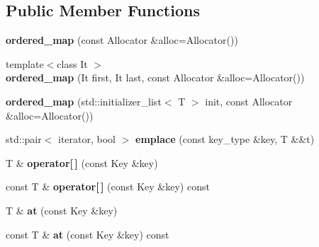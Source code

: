 \subsection*{Public Member Functions}
\begin{DoxyCompactItemize}
\item 
\mbox{\label{structnlohmann_1_1ordered__map_a87938c10b76510dac00412d2cb5fd1e4}} 
{\bfseries ordered\+\_\+map} (const Allocator \&alloc=Allocator())
\item 
\mbox{\label{structnlohmann_1_1ordered__map_a9d25efb51325cc1be027b8ea00c1f8b8}} 
{\footnotesize template$<$class It $>$ }\\{\bfseries ordered\+\_\+map} (It first, It last, const Allocator \&alloc=Allocator())
\item 
\mbox{\label{structnlohmann_1_1ordered__map_a0482ea79e7786367a2d9b5c789c091ce}} 
{\bfseries ordered\+\_\+map} (std\+::initializer\+\_\+list$<$ T $>$ init, const Allocator \&alloc=Allocator())
\item 
\mbox{\label{structnlohmann_1_1ordered__map_a38834c948b844033caa7d5c76fee5866}} 
std\+::pair$<$ iterator, bool $>$ {\bfseries emplace} (const key\+\_\+type \&key, T \&\&t)
\item 
\mbox{\label{structnlohmann_1_1ordered__map_ae7a1ca8c1e234837d137471f73ae6012}} 
T \& {\bfseries operator\mbox{[}$\,$\mbox{]}} (const Key \&key)
\item 
\mbox{\label{structnlohmann_1_1ordered__map_a676082659d575e29bdb312bcde53023a}} 
const T \& {\bfseries operator\mbox{[}$\,$\mbox{]}} (const Key \&key) const
\item 
\mbox{\label{structnlohmann_1_1ordered__map_ab7b4bb185fe7ea84f8f5f32fd230ff91}} 
T \& {\bfseries at} (const Key \&key)
\item 
\mbox{\label{structnlohmann_1_1ordered__map_a8b7f27215180385b9b1e98adc4dd8ae7}} 
const T \& {\bfseries at} (const Key \&key) const
\item 

\end{DoxyCompactItemize}
